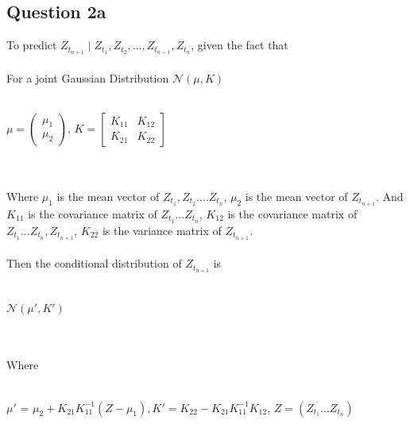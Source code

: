 \documentclass[11pt]{article} %
\begin{document}
\subsection{Question 2a}
To predict $Z_{t_{n+1}}\mid Z_{t_{1}},Z_{t_{2}},...,Z_{t_{n-1}},Z_{t_{n}}$,
given the fact that\\\\
For a joint Gaussian Distribution $\mathcal{N}(\mu,K)$\\\\
\centerline{$\mu = 
\begin{pmatrix}
  \mu_{1} \\
 \mu_{2}
 \end{pmatrix}$,
 $K = 
\begin{bmatrix}
  K_{11} & K_{12} \\
 K_{21} & K_{22}
 \end{bmatrix}$}
 \\\\
 Where $\mu_{1}$ is the mean vector of $Z_{t_{1}}, Z_{t_{2}}.... Z_{t_{n}}$, $\mu_{2}$ is the mean vector of $Z_{t_{n+1}}$. And $K_{11}$ is the covariance matrix of $Z_{t_{1}} ... Z_{t_{n}}$, $K_{12}$ is the covariance matrix of $Z_{t_{1}} ... Z_{t_{n}}, Z_{t_{n+1}}$, $K_{22}$ is the variance matrix of $Z_{t_{n+1}}$.\\\\
Then the conditional distribution of $Z_{t_{n+1}}$ is\\\\
\centerline{$\mathcal{N}(\mu',K')$}\\\\
Where\\\\
\centerline{$\mu'$ = $\mu_{2}+K_{21}K_{11}^{-1}(Z-\mu_{1}),K'=K_{22}-K_{21}K_{11}^{-1}K_{12}$, $Z = (Z_{t_{1}} ... Z_{t_{n}})$}
\end{document}
